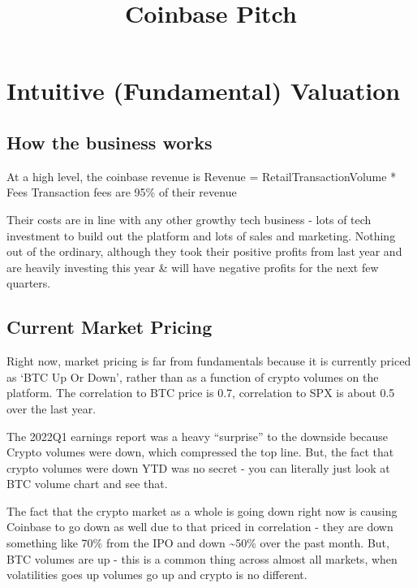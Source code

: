 \documentclass[
]{article}
\title{Coinbase Pitch}
\author{}
\date{\vspace{-2.5em}}
\begin{document}
\maketitle

\hypertarget{intuitive-fundamental-valuation}{%
\section{Intuitive (Fundamental)
Valuation}\label{intuitive-fundamental-valuation}}

\hypertarget{how-the-business-works}{%
\subsection{How the business works}\label{how-the-business-works}}

At a high level, the coinbase revenue is Revenue =
RetailTransactionVolume * Fees Transaction fees are 95\% of their
revenue

Their costs are in line with any other growthy tech business - lots of
tech investment to build out the platform and lots of sales and
marketing. Nothing out of the ordinary, although they took their
positive profits from last year and are heavily investing this year \&
will have negative profits for the next few quarters.

\hypertarget{current-market-pricing}{%
\subsection{Current Market Pricing}\label{current-market-pricing}}

Right now, market pricing is far from fundamentals because it is
currently priced as `BTC Up Or Down', rather than as a function of
crypto volumes on the platform. The correlation to BTC price is 0.7,
correlation to SPX is about 0.5 over the last year.

The 2022Q1 earnings report was a heavy ``surprise'' to the downside
because Crypto volumes were down, which compressed the top line. But,
the fact that crypto volumes were down YTD was no secret - you can
literally just look at BTC volume chart and see that.

The fact that the crypto market as a whole is going down right now is
causing Coinbase to go down as well due to that priced in correlation -
they are down something like 70\% from the IPO and down
\textasciitilde50\% over the past month. But, BTC volumes are up - this
is a common thing across almost all markets, when volatilities goes up
volumes go up and crypto is no different.
\end{document}
